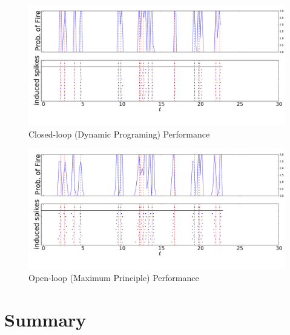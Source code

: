 \documentclass{beamer}
\begin{document}
\begin{frame}
\begin{figure}[htp]     
\begin{center}  
  \includegraphics[width=.99\textwidth]{Figs/TrainController/CRITLN_Ahmadian_cl_trains_sim_10.pdf}
  \caption[ ]{Closed-loop (Dynamic Programing) Performance}
  \label{fig:targettrain_cl_critlownoise}  
\end{center}
\end{figure}   
\end{frame}
\begin{frame}
\begin{figure}[htp]     
\begin{center}  
  \includegraphics[width=.99\textwidth]
  {Figs/TrainController/CRITLN_Ahmadian_ol_trains_sim_10.pdf}
  \caption[ ]{Open-loop (Maximum Principle) Performance}
\end{center}
\end{figure}  
\end{frame}

\section*{Summary}
\end{document}
